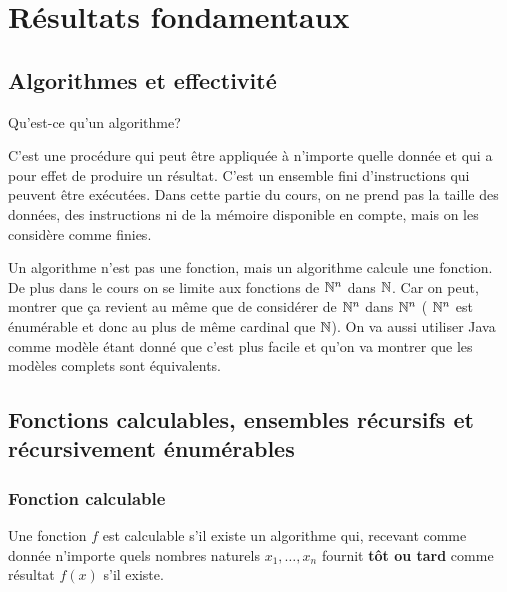 
\chapter{Résultats fondamentaux}
\label{sec:r_sultats_fondamentaux}

\section{Algorithmes et effectivité}
\label{sub:algorithmes_et_effectivit_}
Qu'est-ce qu'un algorithme?

\begin{mydef}[Algorithme]
	C'est une procédure qui peut être appliquée à n'importe
	quelle donnée et qui a pour effet de produire un résultat. C'est un ensemble fini
	d'instructions qui peuvent être exécutées. Dans cette partie du cours, on ne prend pas la taille des données, des instructions ni de la mémoire disponible en compte, mais on les considère comme finies.
\end{mydef}

\begin{myrem}
	Un algorithme n'est pas une fonction, mais un algorithme calcule une fonction.
	De plus dans le cours on se limite aux fonctions de $\mathbb{N}^n$ dans $\mathbb{N}$. Car on peut,
	montrer que ça revient au même que de considérer de $\mathbb{N}^n$ dans $\mathbb{N}^n$ (
	$\mathbb{N}^n$ est énumérable et donc au plus de même cardinal que $\mathbb{N}$). On va aussi
	utiliser Java comme modèle étant donné que c'est plus facile et qu'on va montrer
	que les modèles complets sont équivalents.
\end{myrem}


\section{Fonctions calculables, ensembles récursifs et récursivement énumérables}
\label{sub:fonctions_calculables_ensembles_r_crusids_et_r_cursivement_num_rables}

\subsection{Fonction calculable}
\label{ssub:fonction_calculable}

\begin{mydef}
	Une fonction $f$ est calculable s’il existe un algorithme qui, recevant comme donnée
	n'importe quels nombres naturels $x_1,\ldots,x_n$ fournit \textbf{tôt ou tard} comme
	résultat $f(x)$ s’il existe.
\end{mydef}

